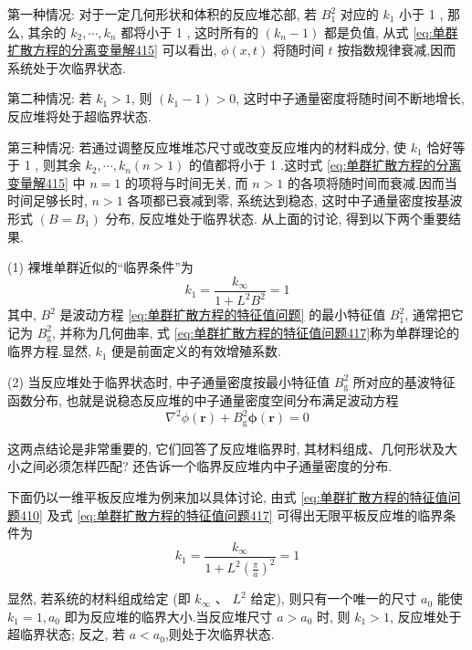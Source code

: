 \documentclass{Sichuan Normal University}
\begin{document}
第一种情况: 对于一定几何形状和体积的反应堆芯部, 若 $B_1^2$ 对应的 $k_1$ 小于 1 , 那么, 其余的 $k_2, \cdots, k_n$ 都将小于 1 , 这时所有的 $\left(k_n-1\right)$ 都是负值, 从式 \eqref{eq:单群扩散方程的分离变量解415} 可以看出, $\phi(x, t)$ 将随时间 $t$ 按指数规律衰减,因而系统处于次临界状态.

第二种情况: 若 $k_1>1$, 则 $\left(k_1-1\right)>0$, 这时中子通量密度将随时间不断地增长, 反应堆将处于超临界状态.

第三种情况: 若通过调整反应堆堆芯尺寸或改变反应堆内的材料成分, 使 $k_1$ 恰好等于 1 , 则其余 $k_2, \cdots, k_n(n>1)$ 的值都将小于 1 .这时式 \eqref{eq:单群扩散方程的分离变量解415} 中 $n=1$ 的项将与时间无关, 而 $n>1$ 的各项将随时间而衰减.因而当时间足够长时, $n>1$ 各项都已衰减到零, 系统达到稳态,
这时中子通量密度按基波形式 $\left(B=B_1\right)$ 分布, 反应堆处于临界状态.
从上面的讨论, 得到以下两个重要结果.

(1) 裸堆单群近似的“临界条件”为
\begin{equation}
k_1=\frac{k_{\infty}}{1+L^2 B^2}=1
\label{eq:单群扩散方程的特征值问题417}
\end{equation}
其中, $B^2$ 是波动方程 \eqref{eq:单群扩散方程的特征值问题} 的最小特征值 $B_1^2$, 通常把它记为 $B_{\mathrm{g}}^2$, 并称为几何曲率, 式 \eqref{eq:单群扩散方程的特征值问题417}称为单群理论的临界方程.显然, $k_1$ 便是前面定义的有效增殖系数.

(2) 当反应堆处于临界状态时, 中子通量密度按最小特征值 $B_{\mathrm{g}}^2$ 所对应的基波特征函数分布, 也就是说稳态反应堆的中子通量密度空间分布满足波动方程
\begin{equation}
\nabla^2 \phi(\boldsymbol{r})+B_{\mathrm{g}}^2 \boldsymbol{\phi}(\boldsymbol{r})=0
\label{eq:单群扩散方程的特征值问题418}
\end{equation}

这两点结论是非常重要的, 它们回答了反应堆临界时, 其材料组成、几何形状及大小之间必须怎样匹配? 还告诉一个临界反应堆内中子通量密度的分布.

下面仍以一维平板反应堆为例来加以具体讨论, 由式 \eqref{eq:单群扩散方程的特征值问题410} 及式 \eqref{eq:单群扩散方程的特征值问题417} 可得出无限平板反应堆的临界条件为
\begin{equation}
k_1=\frac{k_{\infty}}{1+L^2\left(\frac{\pi}{a}\right)^2}=1
\label{eq:单群扩散方程的特征值问题419}
\end{equation}

显然, 若系统的材料组成给定 (即 $k_{\infty}$ 、 $L^2$ 给定), 则只有一个唯一的尺寸 $a_0$ 能使 $k_1=1, a_0$ 即为反应堆的临界大小.当反应堆尺寸 $a>a_0$ 时, 则 $k_1>1$, 反应堆处于超临界状态; 反之, 若 $a<a_0$,则处于次临界状态.
\end{document}
